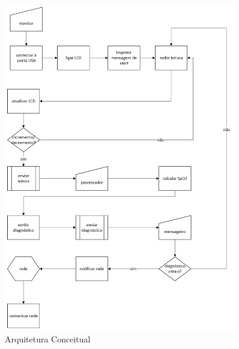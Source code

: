 \begin{figure}[H]
  \centering
  \includegraphics[width=0.9\textwidth]{assets/img/diagrama.png}
  \caption{Arquitetura Conceitual}
  \label{fig:fig4}
\end{figure}